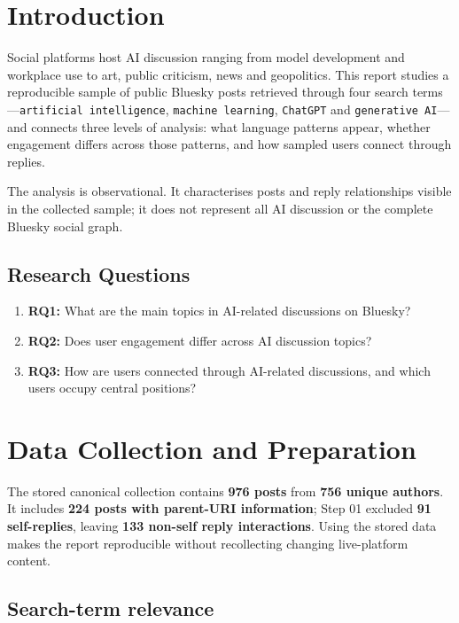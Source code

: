 \documentclass[
]{article}
\providecommand{\tightlist}{%
  \setlength{\itemsep}{0pt}\setlength{\parskip}{0pt}}
\begin{document}
\section{Introduction}\label{introduction}

Social platforms host AI discussion ranging from model development and
workplace use to art, public criticism, news and geopolitics. This
report studies a reproducible sample of public Bluesky posts retrieved
through four search terms---\texttt{artificial\ intelligence},
\texttt{machine\ learning}, \texttt{ChatGPT} and
\texttt{generative\ AI}---and connects three levels of analysis: what
language patterns appear, whether engagement differs across those
patterns, and how sampled users connect through replies.

The analysis is observational. It characterises posts and reply
relationships visible in the collected sample; it does not represent all
AI discussion or the complete Bluesky social graph.

\subsection{Research Questions}\label{research-questions}

\begin{enumerate}
\def\labelenumi{\arabic{enumi}.}
\tightlist
\item
  \textbf{RQ1:} What are the main topics in AI-related discussions on
  Bluesky?
\item
  \textbf{RQ2:} Does user engagement differ across AI discussion topics?
\item
  \textbf{RQ3:} How are users connected through AI-related discussions,
  and which users occupy central positions?
\end{enumerate}

\section{Data Collection and
Preparation}\label{data-collection-and-preparation}

The stored canonical collection contains \textbf{976 posts} from
\textbf{756 unique authors}. It includes \textbf{224 posts with
parent-URI information}; Step 01 excluded \textbf{91 self-replies},
leaving \textbf{133 non-self reply interactions}. Using the stored data
makes the report reproducible without recollecting changing
live-platform content.

\subsection{Search-term relevance}\label{search-term-relevance}
\end{document}

